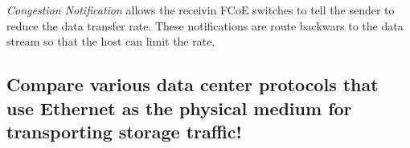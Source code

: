 	\emph{Congestion Notification} allows the receivin FCoE switches to tell the sender to
	reduce the data transfer rate.
	These notifications are route backwars to the data stream so that the host can limit the rate.

\subsection{Compare various data center protocols that use Ethernet as the physical medium for transporting storage traffic!} %
\label{sub:compare_various_data_center_protocols_that_use_ethernet_as_the_physical_medium_for_transporting_storage_traffic}


